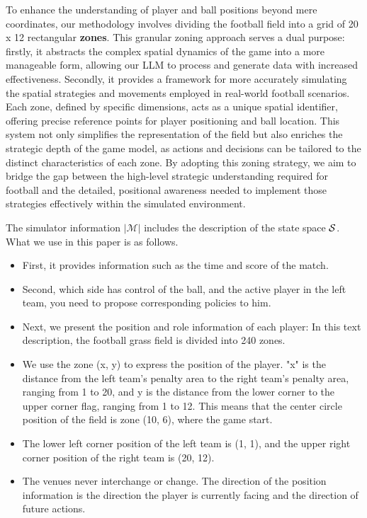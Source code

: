 To enhance the understanding of player and ball positions beyond mere coordinates, our methodology involves dividing the football field into a grid of 20 x 12 rectangular \textbf{zones}. This granular zoning approach serves a dual purpose: firstly, it abstracts the complex spatial dynamics of the game into a more manageable form, allowing our LLM to process and generate data with increased effectiveness. Secondly, it provides a framework for more accurately simulating the spatial strategies and movements employed in real-world football scenarios. Each zone, defined by specific dimensions, acts as a unique spatial identifier, offering precise reference points for player positioning and ball location. This system not only simplifies the representation of the field but also enriches the strategic depth of the game model, as actions and decisions can be tailored to the distinct characteristics of each zone. By adopting this zoning strategy, we aim to bridge the gap between the high-level strategic understanding required for football and the detailed, positional awareness needed to implement those strategies effectively within the simulated environment. 

The simulator information $|\mathcal{M}|$ includes the description of the state space ${\mathcal{S}}$. What we use in this paper is as follows.
\begin{itemize}
    \item First, it provides information such as the time and score of the match. 
    \item Second, which side has control of the ball, and the active player in the left team, you need to propose corresponding policies to him. 
    \item Next, we present the position and role information of each player: In this text description, the football grass field is divided into 240 zones. 
    \item We use the zone (x, y) to express the position of the player. "x" is the distance from the left team's penalty area to the right team's penalty area, ranging from 1 to 20, and y is the distance from the lower corner to the upper corner flag, ranging from 1 to 12.
    This means that the center circle position of the field is zone (10, 6), where the game start.
    \item The lower left corner position of the left team is (1, 1), and the upper right corner position of the right team is (20, 12). 
    \item The venues never interchange or change. The direction of the position information is the direction the player is currently facing and the direction of future actions.
\end{itemize}




